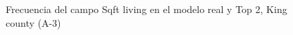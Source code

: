\begin{figure}[H]
    \centering
    
    \caption{Frecuencia del campo Sqft living en el modelo real y Top 2, King county (A-3)}
    \label{frecuency-top2-sqft living}
\end{figure}